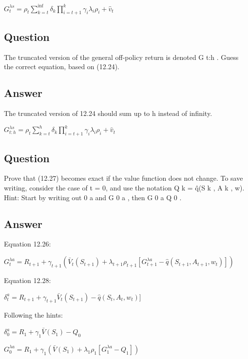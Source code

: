\documentclass[11pt]{article}
\begin{document}
    \noindent $ G_{t}^{\lambda s} = \rho_{t} \sum_{k=t}^{\inf} \delta_{k} \prod_{i=t+1}^{k} \gamma_{i} \lambda_{i} \rho_{i} + \hat{v}_{t} $


    \subsection{Question}

    The truncated version of the general off-policy return is denoted G t:h .
    Guess the correct equation, based on (12.24).

    \subsection*{Answer}

    \noindent The truncated version of 12.24 should sum up to h instead of infinity.

    \noindent $ G_{t:h}^{\lambda s} = \rho_{t} \sum_{k=t}^{h} \delta_{k} \prod_{i=t+1}^{k} \gamma_{i} \lambda_{i} \rho_{i} + \hat{v}_{t} $

    \subsection{Question}

    Prove that (12.27) becomes exact if the value function does not change.
    To save writing, consider the case of t = 0, and use the notation Q k = q̂(S k , A k , w).
    Hint: Start by writing out 0 a and G 0 a , then G 0 a Q 0 .

    \subsection*{Answer}

    \noindent Equation 12.26:

    \noindent $ G_{t}^{\lambda a} = R_{t+1} + \gamma_{t+1} (\bar{V}_{t}(S_{t+1}) + \lambda_{t+1} \rho_{t+1} [ G_{t+1}^{\lambda a} -\hat{q}(S_{t+1},A_{t+1}, w_{t})] ) $

    \hfill \break
    \noindent Equation 12.28:

    \noindent $ \delta_{t}^{a} = R_{t+1} + \gamma_{t+1} \bar{V}_t(S_{t+1}) - \hat{q}(S_{t},A_{t}, w_{t}) ] $

    \hfill \break
    \noindent Following the hints:

    \noindent $ \delta_{0}^{a} = R_{1} + \gamma_{1} \bar{V}(S_{1}) - Q_{0} $

    \noindent $ G_{0}^{\lambda a} = R_{1} + \gamma_{1} (\bar{V}(S_{1}) + \lambda_{1} \rho_{1} [ G_{1}^{\lambda a} -Q_{1}] ) $
\end{document}
